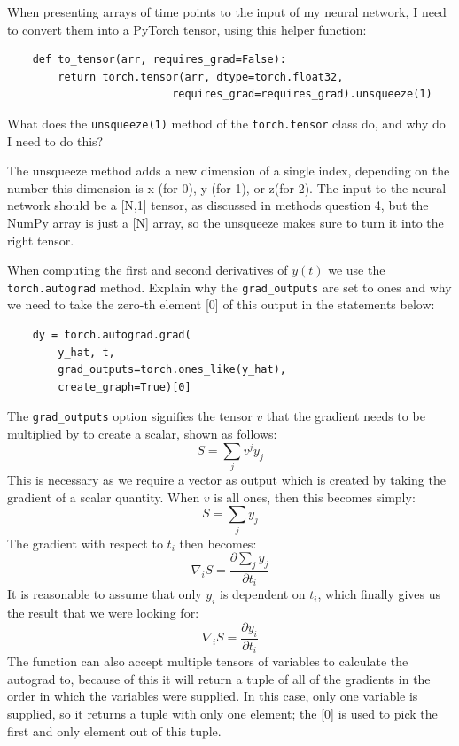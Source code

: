 \documentclass[12pt, a4paper]{report}
\begin{document}
\begin{tcolorbox}[title=Code Question 8,sharp corners, colframe=black, colback=white]
    When presenting arrays of time points to the input of my neural network, I need to convert them into a PyTorch tensor, using this helper function:
    \begin{verbatim}
    def to_tensor(arr, requires_grad=False):
        return torch.tensor(arr, dtype=torch.float32,
                          requires_grad=requires_grad).unsqueeze(1)
    \end{verbatim}
    What does the \verb|unsqueeze(1)| method of the \verb|torch.tensor| class do, and why do I need to do this?
\end{tcolorbox}
The unsqueeze method adds a new dimension of a single index, depending on the number this dimension is x (for 0), y (for 1), or z(for 2). The input to the neural network should be a [N,1] tensor, as discussed in methods question 4, but the NumPy array is just a [N] array, so the unsqueeze makes sure to turn it into the right tensor.\\

\begin{tcolorbox}[title=Code Question 9,sharp corners, colframe=black, colback=white]
    When computing the first and second derivatives of $y(t)$ we use the \verb|torch.autograd| method. Explain why the \verb|grad_outputs| are set to ones and why we need to take the zero-th element [0] of this output in the statements below:
    \begin{verbatim}
    dy = torch.autograd.grad(
        y_hat, t,
        grad_outputs=torch.ones_like(y_hat),
        create_graph=True)[0]
    \end{verbatim}
\end{tcolorbox}
The \verb|grad_outputs| option signifies the tensor $v$ that the gradient needs to be multiplied by to create a scalar, shown as follows:
\[
S = \sum_j v^j y_j
\]
This is necessary as we require a vector as output which is created by taking the gradient of a scalar quantity.
When $v$ is all ones, then this becomes simply:
\[
S = \sum_j y_j
\]
The gradient with respect to $t_i$ then becomes:
\[
\nabla_i S = \frac{\partial \sum_j y_j}{\partial t_i}
\]
It is reasonable to assume that only $y_i$ is dependent on $t_i$, which finally gives us the result that we were looking for:
\[
\nabla_i S = \frac{\partial y_i}{\partial t_i}
\]
The function can also accept multiple tensors of variables to calculate the autograd to, because of this it will return a tuple of all of the gradients in the order in which the variables were supplied. In this case, only one variable is supplied, so it returns a tuple with only one element; the [0] is used to pick the first and only element out of this tuple.
\end{document}
